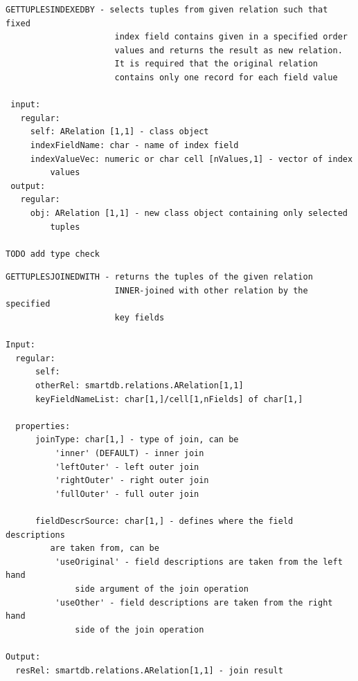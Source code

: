 \documentclass[letterpaper,10pt,english]{sphinxmanual}
\begin{document}
\begin{Verbatim}[commandchars=\\\{\}]
 GETTUPLESINDEXEDBY - selects tuples from given relation such that fixed
                      index field contains given in a specified order
                      values and returns the result as new relation.
                      It is required that the original relation
                      contains only one record for each field value

 input:
   regular:
     self: ARelation [1,1] - class object
     indexFieldName: char - name of index field
     indexValueVec: numeric or char cell [nValues,1] - vector of index
         values
 output:
   regular:
     obj: ARelation [1,1] - new class object containing only selected
         tuples

TODO add type check
\end{Verbatim}

\begin{Verbatim}[commandchars=\\\{\}]
GETTUPLESJOINEDWITH - returns the tuples of the given relation
                      INNER-joined with other relation by the specified
                      key fields

Input:
  regular:
      self:
      otherRel: smartdb.relations.ARelation[1,1]
      keyFieldNameList: char[1,]/cell[1,nFields] of char[1,]

  properties:
      joinType: char[1,] - type of join, can be
          'inner' (DEFAULT) - inner join
          'leftOuter' - left outer join
          'rightOuter' - right outer join
          'fullOuter' - full outer join

      fieldDescrSource: char[1,] - defines where the field descriptions
         are taken from, can be
          'useOriginal' - field descriptions are taken from the left hand
              side argument of the join operation
          'useOther' - field descriptions are taken from the right hand
              side of the join operation

Output:
  resRel: smartdb.relations.ARelation[1,1] - join result
\end{Verbatim}
\end{document}
